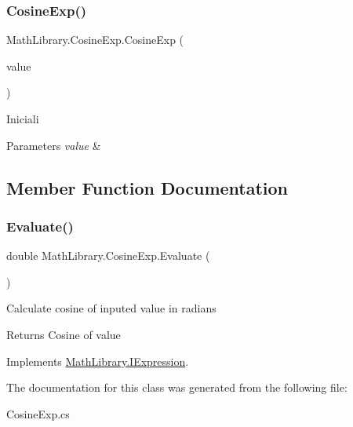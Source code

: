 \subsubsection{\texorpdfstring{CosineExp()}{CosineExp()}}
{\footnotesize\ttfamily Math\+Library.\+Cosine\+Exp.\+Cosine\+Exp (\begin{DoxyParamCaption}\item[{\mbox{\hyperlink{interface_math_library_1_1_i_expression}{I\+Expression}}}]{value }\end{DoxyParamCaption})\hspace{0.3cm}{\ttfamily [inline]}}



Iniciali 


\begin{DoxyParams}{Parameters}
{\em value} & \\
\hline
\end{DoxyParams}


\subsection{Member Function Documentation}
\mbox{\label{class_math_library_1_1_cosine_exp_a52b7c030eab112cfa56af87be60f1112}} 
\subsubsection{\texorpdfstring{Evaluate()}{Evaluate()}}
{\footnotesize\ttfamily double Math\+Library.\+Cosine\+Exp.\+Evaluate (\begin{DoxyParamCaption}{ }\end{DoxyParamCaption})\hspace{0.3cm}{\ttfamily [inline]}}



Calculate cosine of inputed value in radians 

\begin{DoxyReturn}{Returns}
Cosine of value
\end{DoxyReturn}


Implements \mbox{\hyperlink{interface_math_library_1_1_i_expression}{Math\+Library.\+I\+Expression}}.



The documentation for this class was generated from the following file\+:\begin{DoxyCompactItemize}
\item 
Cosine\+Exp.\+cs\end{DoxyCompactItemize}

